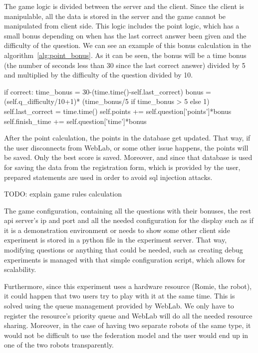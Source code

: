 The game logic is divided between the server and the client. Since the client is manipulable, all
the data is stored in the server and the game cannot be manipulated from client side. This logic
includes the point logic, which has a small bonus depending on when has the last correct answer been
given and the difficulty of the question. We can see an example of this bonus calculation in the
algorithm~\ref{alg:point_bonus}. As it can be seen, the bonus will be a time bonus (the number of
seconds less than 30 since the last correct answer) divided by 5 and multiplied by the difficulty of
the question divided by 10.

\begin{center}
\begin{minipage}{.9\textwidth}
\singlespace
{}
\begin{pyglist}[language=python, caption={Point bonus calculation.},
	label={alg:point_bonus}, listingname={Algorithm}, numbers=left]
if correct:
    time_bonus = 30-(time.time()-self.last_correct)
    bonus = (self.q_difficulty/10+1)*
        (time_bonus/5 if time_bonus > 5 else 1)
    self.last_correct = time.time()
    self.points += self.question['points']*bonus
    self.finish_time += self.question['time']*bonus
\end{pyglist}
\end{minipage}
\end{center}

After the point calculation, the points in the database get updated. That way, if the user
disconnects from WebLab, or some other issue happens, the points will be saved. Only the best
score is saved. Moreover, and since that database is used for saving the data from the registration
form, which is provided by the user, prepared statements are used in order to avoid \acrshort{sql}
injection attacks.

TODO: explain game rules calculation

The game configuration, containing all the questions with their bonuses, the \acrshort{rest}
\acrshort{api} server's \acrshort{ip} and port and all the needed configuration for the display such
as if it is a demonstration environment or needs to show some other client side experiment is stored
in a python file in the experiment server. That way, modifying questions or anything that could be
needed, such as creating debug experiments is managed with that simple configuration script, which
allows for scalability.

Furthermore, since this experiment uses a hardware resource (Romie, the robot), it could happen that
two users try to play with it at the same time. This is solved using the queue management provided
by WebLab. We only have to register the resource's priority queue and WebLab will do all the needed
resource sharing. Moreover, in the case of having two separate robots of the same type, it would not
be difficult to use the federation model and the user would end up in one of the two robots
transparently.

